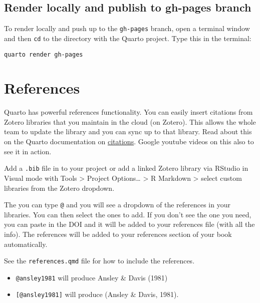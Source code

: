 \documentclass[
  11pt,
  letterpaper,
  oneside,
  open=any]{scrbook}
\begin{document}
\hypertarget{render-locally-and-publish-to-gh-pages-branch}{%
\section{Render locally and publish to gh-pages
branch}\label{render-locally-and-publish-to-gh-pages-branch}}

To render locally and push up to the \texttt{gh-pages} branch, open a
terminal window and then \texttt{cd} to the directory with the Quarto
project. Type this in the terminal:

\begin{verbatim}
quarto render gh-pages
\end{verbatim}


\hypertarget{references-1}{%
\chapter{References}\label{references-1}}

Quarto has powerful references functionality. You can easily insert
citations from Zotero libraries that you maintain in the cloud (on
Zotero). This allows the whole team to update the library and you can
sync up to that library. Read about this on the Quarto documentation on
\href{https://quarto.org/docs/visual-editor/technical.html\#citations}{citations}.
Google youtube videos on this also to see it in action.

Add a \texttt{.bib} file in to your project or add a linked Zotero
library via RStudio in Visual mode with Tools \textgreater{} Project
Options\ldots{} \textgreater{} R Markdown \textgreater{} select custom
libraries from the Zotero dropdown.

The you can type \texttt{@} and you will see a dropdown of the
references in your libraries. You can then select the ones to add. If
you don't see the one you need, you can paste in the DOI and it will be
added to your references file (with all the info). The references will
be added to your references section of your book automatically.

See the \texttt{references.qmd} file for how to include the references.

\begin{itemize}
\item
  \texttt{@ansley1981} will produce Ansley \& Davis (1981)
\item
  \texttt{{[}@ansley1981{]}} will produce (Ansley \& Davis, 1981).
\end{itemize}
\end{document}
